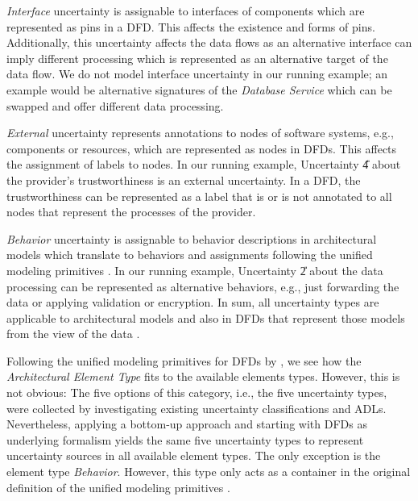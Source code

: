\emph{Interface} uncertainty is assignable to interfaces of components which are represented as pins in a \ac{DFD}.
This affects the existence and forms of pins.
Additionally, this uncertainty affects the data flows as an alternative interface can imply different processing which is represented as an alternative target of the data flow.
We do not model interface uncertainty in our running example; an example would be alternative signatures of the \emph{Database Service} which can be swapped and offer different data processing.

\emph{External} uncertainty represents annotations to nodes of software systems, e.g., components or resources, which are represented as nodes in \acp{DFD}.
This affects the assignment of labels to nodes.
In our running example, Uncertainty \U{4} about the provider's trustworthiness is an external uncertainty.
In a \ac{DFD}, the trustworthiness can be represented as a label that is or is not annotated to all nodes that represent the processes of the provider.

\emph{Behavior} uncertainty is assignable to behavior descriptions in architectural models which translate to behaviors and assignments following the unified modeling primitives \cite{seifermann_unified_2021}.
In our running example, Uncertainty \U{2} about the data processing can be represented as alternative behaviors, e.g., just forwarding the data or applying validation or encryption.
In sum, all uncertainty types are applicable to architectural models and also in \acp{DFD} that represent those models from the view of the data \cite{seifermann_data-driven_2019}.

Following the unified modeling primitives for \acp{DFD} by \textcite{seifermann_unified_2021}, we see how the \emph{Architectural Element Type} fits to the available elements types.
However, this is not obvious: The five options of this category, i.e., the five uncertainty types, were collected by investigating existing uncertainty classifications and \acp{ADL}.
Nevertheless, applying a bottom-up approach and starting with \acp{DFD} as underlying formalism yields the same five uncertainty types to represent uncertainty sources in all available element types.
The only exception is the element type \emph{Behavior}.
However, this type only acts as a container in the original definition of the unified modeling primitives \textcite{seifermann_unified_2021}.



